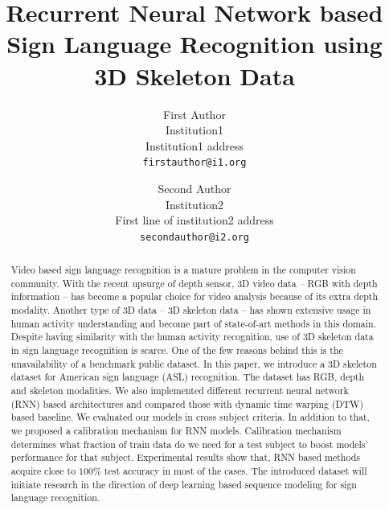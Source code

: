 \documentclass[10pt,twocolumn,letterpaper]{article}
\begin{document}
\title{Recurrent Neural Network based Sign Language Recognition using 3D Skeleton Data}

\author{First Author\\
Institution1\\
Institution1 address\\
{\tt\small firstauthor@i1.org}
\and
Second Author\\
Institution2\\
First line of institution2 address\\
{\tt\small secondauthor@i2.org}
}

\maketitle

\begin{abstract}
Video based sign language recognition is a mature problem in the computer vision community. With the recent upsurge of depth sensor, 3D video data -- RGB with depth information -- has become a popular choice for video analysis because of its extra depth modality. Another type of 3D data -- 3D skeleton data -- has shown extensive usage in human activity understanding and become part of state-of-art methods in this domain. Despite having similarity with the human activity recognition, use of 3D skeleton data in sign language recognition is scarce. One of the few reasons behind this is the unavailability of a benchmark public dataset. In this paper, we introduce a 3D skeleton dataset for American sign language (ASL) recognition. The dataset has RGB, depth and skeleton modalities. We also implemented different recurrent neural network (RNN) based architectures and compared those with dynamic time warping (DTW) based baseline. We evaluated our models in cross subject criteria. In addition to that, we proposed a calibration mechanism for RNN models. Calibration mechanism determines what fraction of train data do we need for a test subject to boost models' performance for that subject. Experimental results show that, RNN based methods acquire close to $100\%$ test accuracy in most of the cases. The introduced dataset will initiate research in the direction of deep learning based sequence modeling for sign language recognition. 
\end{abstract}
\end{document}
